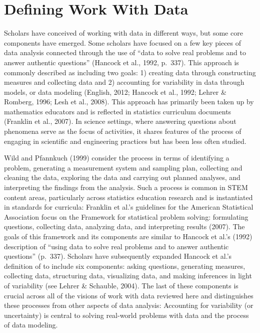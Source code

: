 \documentclass[]{book}
\theoremstyle{definition}
\theoremstyle{definition}
\theoremstyle{definition}
\theoremstyle{remark}
\begin{document}
\section{Defining Work With Data}\label{defining-work-with-data}

Scholars have conceived of working with data in different ways, but some
core components have emerged. Some scholars have focused on a few key
pieces of data analysis connected through the use of ``data to solve
real problems and to answer authentic questions'' (Hancock et al., 1992,
p.~337). This approach is commonly described as including two goals: 1)
creating data through constructing measures and collecting data and 2)
accounting for variability in data through models, or data modeling
(English, 2012; Hancock et al., 1992; Lehrer \& Romberg, 1996; Lesh et
al., 2008). This approach has primarily been taken up by mathematics
educators and is reflected in statistics curriculum documents (Franklin
et al., 2007). In science settings, where answering questions about
phenomena serve as the focus of activities, it shares features of the
process of engaging in scientific and engineering practices but has been
less often studied.

Wild and Pfannkuch (1999) consider the process in terms of identifying a
problem, generating a measurement system and sampling plan, collecting
and cleaning the data, exploring the data and carrying out planned
analyses, and interpreting the findings from the analysis. Such a
process is common in STEM content areas, particularly across statistics
education research and is instantiated in standards for curricula:
Franklin et al.'s guidelines for the American Statistical Association
focus on the Framework for statistical problem solving: formulating
questions, collecting data, analyzing data, and interpreting results
(2007). The goals of this framework and its components are similar to
Hancock et al.'s (1992) description of ``using data to solve real
problems and to answer authentic questions'' (p.~337). Scholars have
subsequently expanded Hancock et al.'s definition of to include six
components: asking questions, generating measures, collecting data,
structuring data, visualizing data, and making inferences in light of
variability (see Lehrer \& Schauble, 2004). The last of these components
is crucial across all of the visions of work with data reviewed here and
distinguishes these processes from other aspects of data analysis:
Accounting for variability (or uncertainty) is central to solving
real-world problems with data and the process of data modeling.
\end{document}
